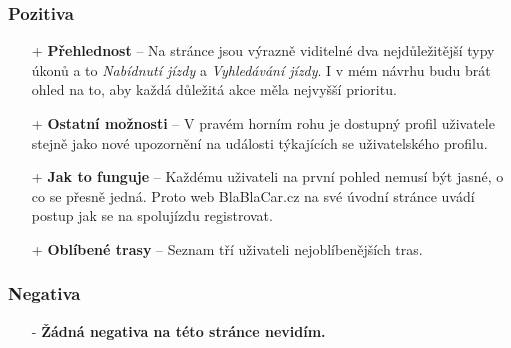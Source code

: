\subsubsection*{Pozitiva}
\begin{itemize}
    \item[+] \textbf{Přehlednost} -- Na stránce jsou výrazně viditelné dva nejdůležitější typy úkonů a to \textit{Nabídnutí jízdy} a \textit{Vyhledávání jízdy}. I v mém návrhu budu brát ohled na to, aby každá důležitá akce měla nejvyšší prioritu.
    \item[+] \textbf{Ostatní možnosti} -- V pravém horním rohu je dostupný profil uživatele stejně jako nové upozornění na události týkajících se uživatelského profilu.
    \item[+] \textbf{Jak to funguje} -- Každému uživateli na první pohled nemusí být jasné, o co se přesně jedná. Proto web BlaBlaCar.cz na své úvodní stránce uvádí postup jak se na spolujízdu registrovat.
    \item[+] \textbf{Oblíbené trasy} -- Seznam tří uživateli nejoblíbenějších tras.
\end{itemize}
\subsubsection*{Negativa}
\begin{itemize}
    \item[-] \textbf{Žádná negativa na této stránce nevidím.}
\end{itemize}



\newpage
